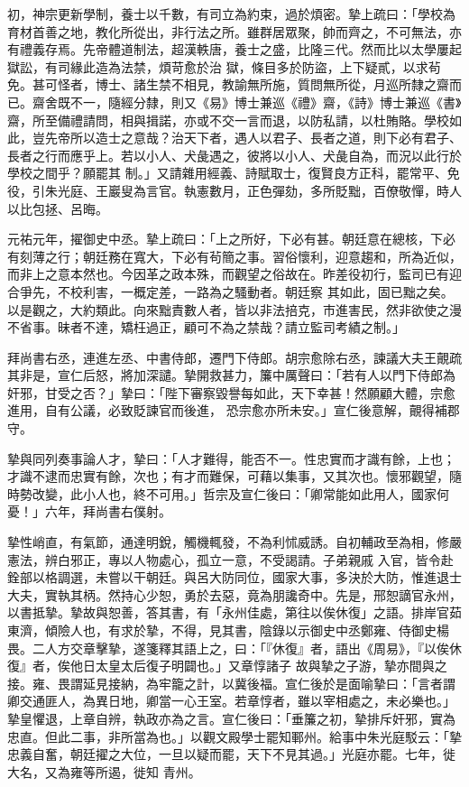 \begin{pinyinscope}
 初，神宗更新學制，養士以千數，有司立為約束，過於煩密。摯上疏曰：「學校為育材首善之地，教化所從出，非行法之所。雖群居眾聚，帥而齊之，不可無法，亦有禮義存焉。先帝體道制法，超漢軼唐，養士之盛，比隆三代。然而比以太學屢起獄訟，有司緣此造為法禁，煩苛愈於治
 獄，條目多於防盜，上下疑貳，以求茍免。甚可怪者，博士、諸生禁不相見，教諭無所施，質問無所從，月巡所隸之齋而已。齋舍既不一，隨經分隸，則又《易》博士兼巡《禮》齋，《詩》博士兼巡《書》齋，所至備禮請問，相與揖諾，亦或不交一言而退，以防私請，以杜賄賂。學校如此，豈先帝所以造士之意哉？治天下者，遇人以君子、長者之道，則下必有君子、長者之行而應乎上。若以小人、犬彘遇之，彼將以小人、犬彘自為，而況以此行於學校之間乎？願罷其
 制。」又請雜用經義、詩賦取士，復賢良方正科，罷常平、免役，引朱光庭、王巖叟為言官。執憲數月，正色彈劾，多所貶黜，百僚敬憚，時人以比包拯、呂晦。



 元祐元年，擢御史中丞。摯上疏曰：「上之所好，下必有甚。朝廷意在總核，下必有刻薄之行；朝廷務在寬大，下必有茍簡之事。習俗懷利，迎意趨和，所為近似，而非上之意本然也。今因革之政本殊，而觀望之俗故在。昨差役初行，監司已有迎合爭先，不校利害，一概定差，一路為之騷動者。朝廷察
 其如此，固已黜之矣。以是觀之，大約類此。向來黜責數人者，皆以非法掊克，市進害民，然非欲使之漫不省事。昧者不達，矯枉過正，顧可不為之禁哉？請立監司考績之制。」



 拜尚書右丞，連進左丞、中書侍郎，遷門下侍郎。胡宗愈除右丞，諫議大夫王覿疏其非是，宣仁后怒，將加深譴。摯開救甚力，簾中厲聲曰：「若有人以門下侍郎為奸邪，甘受之否？」摯曰：「陛下審察毀譽每如此，天下幸甚！然願顧大體，宗愈進用，自有公議，必致貶諫官而後進，
 恐宗愈亦所未安。」宣仁後意解，覿得補郡守。



 摯與同列奏事論人才，摯曰：「人才難得，能否不一。性忠實而才識有餘，上也；才識不逮而忠實有餘，次也；有才而難保，可藉以集事，又其次也。懷邪觀望，隨時勢改變，此小人也，終不可用。」哲宗及宣仁後曰：「卿常能如此用人，國家何憂！」六年，拜尚書右僕射。



 摯性峭直，有氣節，通達明銳，觸機輒發，不為利怵威誘。自初輔政至為相，修嚴憲法，辨白邪正，專以人物處心，孤立一意，不受謁請。子弟親戚
 入官，皆令赴銓部以格調選，未嘗以干朝廷。與呂大防同位，國家大事，多決於大防，惟進退士大夫，實執其柄。然持心少恕，勇於去惡，竟為朋讒奇中。先是，邢恕謫官永州，以書抵摯。摯故與恕善，答其書，有「永州佳處，第往以俟休復」之語。排岸官茹東濟，傾險人也，有求於摯，不得，見其書，陰錄以示御史中丞鄭雍、侍御史楊畏。二人方交章擊摯，遂箋釋其語上之，曰：「『休復』者，語出《周易》，『以俟休復』者，俟他日太皇太后復子明闢也。」又章惇諸子
 故與摯之子游，摯亦間與之接。雍、畏謂延見接納，為牢籠之計，以冀後福。宣仁後於是面喻摯曰：「言者謂卿交通匪人，為異日地，卿當一心王室。若章惇者，雖以宰相處之，未必樂也。」摯皇懼退，上章自辨，執政亦為之言。宣仁後曰：「垂簾之初，摯排斥奸邪，實為忠直。但此二事，非所當為也。」以觀文殿學士罷知鄆州。給事中朱光庭駁云：「摯忠義自奮，朝廷擢之大位，一旦以疑而罷，天下不見其過。」光庭亦罷。七年，徙大名，又為雍等所遏，徙知
 青州。




\end{pinyinscope}
